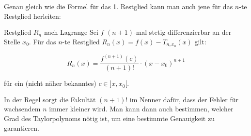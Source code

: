 Genau gleich wie die Formel für das 1. Restglied kann man auch jene für das $n$-te Restglied herleiten:
\begin{satz}
    {Restglied $R_n$ nach Lagrange}{}
    Sei \( f \) \((n+1)\)-mal stetig differenzierbar an der Stelle \( x_0 \). Für das \( n \)-te Restglied \( R_n(x) = f(x) - T_{n,x_0}(x) \) gilt:

\[ R_n(x) = \frac{f^{(n+1)}(c)}{(n+1)!} \cdot (x - x_0)^{n+1} \]

für ein (nicht näher bekanntes) \( c \in ]x, x_0[ \).

\end{satz}

In der Regel sorgt die Fakultät $(n+1)!$ im Nenner dafür, dass der Fehler für wachsendem $n$ immer kleiner wird. Man kann dann auch bestimmen, welcher Grad des Taylorpolynoms nötig ist, um eine bestimmte Genauigkeit zu garantieren.

